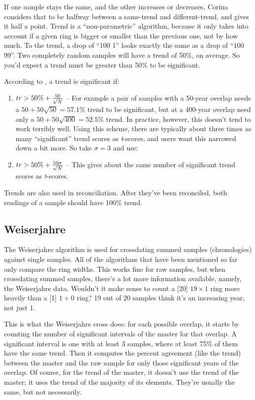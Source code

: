 If one sample stays the same, and the other increases or decreases, Corina considers that to be halfway between a same-trend and different-trend, and gives it half a point. Trend is a ``non-parametric'' algorithm, because it only takes into account if a given ring is bigger or smaller than the previous one, not by how much. To the trend, a drop of ``100 1'' looks exactly the same as a drop of ``100 99''. Two completely random samples will have a trend of 50\%, on average. So you'd expect a trend must be greater than 50\% to be significant.

According to \citet{Huber70}, a trend is significant if:

\begin{enumerate}
  \item \textbf{$tr > 50\% + {50 \over \sqrt{N}}$} -- For example a pair of samples with a 50-year overlap needs a $50+50\sqrt{50} = 57.1\%$ trend to be significant, but at a 400-year overlap need only a $50 + 50\sqrt{400} = 52.5\%$ trend. In practice, however, this doesn't tend to work terribly well. Using this scheme, there are typically about three times as many ``significant'' trend scores as \textit{t}-scores, and users want this narrowed down a bit more. So take $\sigma=3$ and use:
  \item $tr > 50\% + {50\sigma \over \sqrt{N}}$ -- This gives about the same number of significant trend scores as \textit{t}-scores. 

\end{enumerate}

Trends are also used in reconciliation. After they've been reconciled, both readings of a sample should have 100\% trend. 

\subsection{Weiserjahre}
The Weiserjahre algorithm is used for crossdating summed samples (chronologies) against single samples. All of the algorithms that have been mentioned so far only compare the ring widths. This works fine for raw samples, but when crossdating summed samples, there's a lot more information available, namely, the Weiserjahre data. Wouldn't it make sense to count a [20] $19\times1$ ring more heavily than a [1] $1\div0$ ring? 19 out of 20 samples think it's an increasing year, not just 1. 

This is what the Weiserjahre cross does: for each possible overlap, it starts by counting the number of significant intervals of the master for that overlap. A significant interval is one with at least 3 samples, where at least 75\% of them have the same trend. Then it computes the percent agreement (like the trend) between the master and the raw sample for only those significant years of the overlap. Of course, for the trend of the master, it doesn't use the trend of the master; it uses the trend of the majority of its elements. They're usually the same, but not necessarily.

